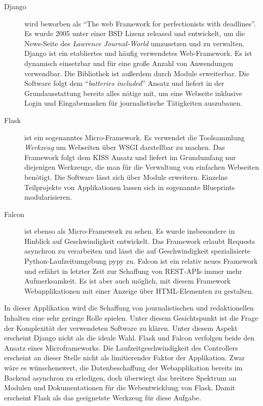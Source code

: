 \begin{description}
 \item [Django] wird beworben als "`The web \gls{Framework}  for perfectionists with dead\-lines"'. Es wurde 2005 unter einer BSD Lizenz released und entwickelt, um die News-Seite des \textit{Lawrence Journal-World} umzusetzen und zu verwalten. Django ist ein etabliertes und häufig verwendetes Web-Framework. Es ist dynamisch einsetzbar und für eine große Anzahl von Anwendungen verwendbar. Die Bibliothek ist außerdem durch Module erweiterbar. Die Software folgt dem "`\textit{batteries included}"' Ansatz und liefert in der Grundausstattung bereits alles nötige mit, um eine Webseite inklusive Login und Eingabemasken für journalistische Tätigkeiten auszubauen.

 \item [Flask] ist ein sogenanntes Micro-\gls{Framework}. Es verwendet die Toolsammlung \textit{Werkzeug} um Webseiten über WSGI darstellbar zu machen. Das \gls{Framework} folgt dem KISS Ansatz und liefert im Grundumfang nur diejenigen Werkzeuge, die man für die Verwaltung von einfachen Webseiten benötigt. Die Software lässt sich über Module erweitern. Einzelne Teilprojekte von Applikationen lassen sich in sogenannte Blueprints modularisieren.

 \item [Falcon] ist ebenso als Micro-\gls{Framework} zu sehen. Es wurde insbesondere in Hinblick auf Geschwindigkeit entwickelt. Das \gls{Framework} erlaubt Requests asynchron zu verarbeiten und lässt die auf Geschwindigkeit spezialisierte Python-Laufzeitumgebung pypy zu. Falcon ist ein relativ neues \gls{Framework} und erfährt in letzter Zeit zur Schaffung von REST-APIs immer mehr Aufmerksamkeit. Es ist aber auch möglich, mit diesem \gls{Framework} Webapplikationen mit einer Anzeige über HTML-Elementen zu gestalten.
\end{description}

In dieser Applikation wird die Schaffung von journalistischen und redaktionellen Inhalten eine sehr geringe Rolle spielen. Unter diesem Gesichtspunkt ist die Frage der Komplexität der verwendeten Software zu klären. Unter diesem Aspekt erscheint Django nicht als die ideale Wahl.
Flask und Falcon verfolgen beide den Ansatz eines Microframeworks. Die Laufzeitgeschwindigkeit des \gls{Controller}s erscheint an dieser Stelle nicht als limitierender Faktor der Applikation. Zwar wäre es wünschenswert, die Datenbeschaffung der Webapplikation bereits im Backend asynchron zu erledigen, doch überwiegt das breitere Spektrum an Modulen und Dokumentationen für die Webentwicklung von Flask.
Damit erscheint Flask als das geeignetste Werkzeug für diese Aufgabe.


